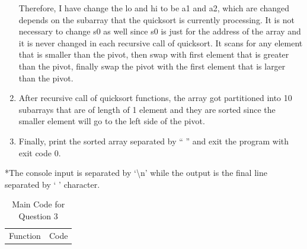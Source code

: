 \documentclass[10pt,a4paper]{article}
\begin{document}
\begin{ans}
\begin{enumerate}
		Therefore, I have change the lo and hi to be a1 and a2, which are changed depends on the subarray that the quicksort is currently processing. It is not necessary to change s0 as well since s0 is just for the address of the array and it is never changed in each recursive call of quicksort. 
		It scans for any element that is smaller than the pivot, then swap with first element that is greater than the pivot, finally swap the pivot with the first element that is larger than the pivot. 
		\item 	After recursive call of quicksort functions, the array got partitioned into 10 subarrays that are of length of 1 element and they are sorted since the smaller element will go to the left side of the pivot. 
		\item 	Finally, print the sorted array separated by `` '' and exit the program with exit code 0. 
	\end{enumerate}
	*The console input is separated by `\textbackslash n' while the output is the final line separated by ` ' character. 
	
	\begin{table}[htbp]
        \begin{center}
			\caption{Main Code for Question 3}
				\begin{tabular}[H]{|M{3cm}|M{12cm}|}
					\hline
					Function & Code\\


\end{tabular}
\end{center}
\end{table}
\end{ans}
\end{document}
